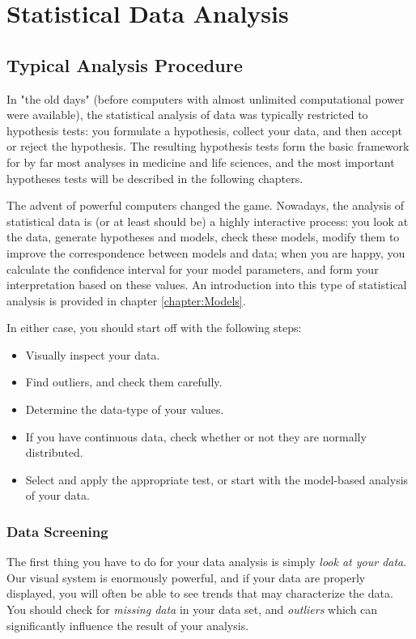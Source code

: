 \chapter{Statistical Data Analysis}

\section{Typical Analysis Procedure}

In "the old days" (before computers with almost unlimited computational power were available), the statistical analysis of data was typically restricted to hypothesis tests: you formulate a hypothesis, collect your data, and then accept or reject the hypothesis. The resulting hypothesis tests form the basic framework for by far most analyses in  medicine and life sciences, and the most important hypotheses tests will be described in the following chapters.

The advent of powerful computers changed the game. Nowadays, the analysis of statistical data is (or at least should be) a highly interactive process: you look at the data, generate hypotheses and models, check these models, modify them to improve the correspondence between models and data; when you are happy, you calculate the confidence interval for your model parameters, and form your interpretation based on these values. An introduction into this type of statistical analysis is provided in chapter \ref{chapter:Models}.

In either case, you should start off with the following steps:
\begin{itemize}
  \item Visually inspect your data.
  \item Find outliers, and check them carefully.
  \item Determine the data-type of your values.
  \item If you have continuous data, check whether or not they are normally distributed.
  \item Select and apply the appropriate test, or start with the model-based analysis of your data.
\end{itemize}

\subsection{Data Screening}

The first thing you have to do for your data analysis is simply \emph{look at your data}. Our visual system is enormously powerful, and if your data are properly displayed, you will often be able to see trends that may characterize the data. You should check for \emph{missing data} in your data set, and \emph{outliers} which can significantly influence the result of your analysis.

